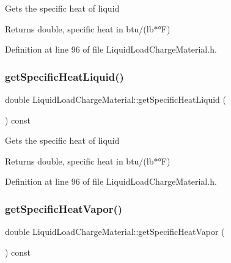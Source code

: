 Gets the specific heat of liquid \begin{DoxyReturn}{Returns}
double, specific heat in btu/(lb$\ast$°F) 
\end{DoxyReturn}


Definition at line 96 of file Liquid\+Load\+Charge\+Material.\+h.

\mbox{\label{class_liquid_load_charge_material_aa698f1f73dff91951139a4a50582963d}} 
\subsubsection{\texorpdfstring{get\+Specific\+Heat\+Liquid()}{getSpecificHeatLiquid()}\hspace{0.1cm}{\footnotesize\ttfamily [3/3]}}
{\footnotesize\ttfamily double Liquid\+Load\+Charge\+Material\+::get\+Specific\+Heat\+Liquid (\begin{DoxyParamCaption}{ }\end{DoxyParamCaption}) const\hspace{0.3cm}{\ttfamily [inline]}}

Gets the specific heat of liquid \begin{DoxyReturn}{Returns}
double, specific heat in btu/(lb$\ast$°F) 
\end{DoxyReturn}


Definition at line 96 of file Liquid\+Load\+Charge\+Material.\+h.

\mbox{\label{class_liquid_load_charge_material_ac4538f9722bf25465ec86586469a7b1e}} 
\subsubsection{\texorpdfstring{get\+Specific\+Heat\+Vapor()}{getSpecificHeatVapor()}\hspace{0.1cm}{\footnotesize\ttfamily [1/3]}}
{\footnotesize\ttfamily double Liquid\+Load\+Charge\+Material\+::get\+Specific\+Heat\+Vapor (\begin{DoxyParamCaption}{ }\end{DoxyParamCaption}) const\hspace{0.3cm}{\ttfamily [inline]}}

